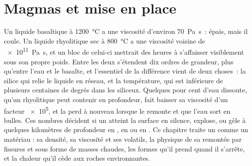 \chapter{Magmas et mise en place}\label{ch:b2:magma-emplacement}

Un liquide basaltique à \qty{1200}{\celsius} a une viscosité d'environ
\qty{70}{Pa.s}~: épais, mais il coule. Un liquide rhyolitique sec à \qty{800}{\celsius}
a une viscosité voisine de \qty{e11}{Pa.s}, et un bloc de celui-ci mettrait des heures à
s'affaisser visiblement sous son propre poids. Entre les deux s'étendent dix ordres de grandeur, plus
qu'entre l'eau et le basalte, et l'essentiel de la différence vient de deux
choses~: la silice qui relie le liquide en réseau, et la température,
qui est inférieure de plusieurs centaines de degrés dans les  siliceux. Quelques pour cent d'eau
dissoute, qu'un  rhyolitique peut contenir en profondeur, fait baisser sa viscosité
d'un facteur \num{e5}, et la perd à nouveau lorsque le  remonte et que l'eau
sort en bulles. Ces nombres décident si un  atteint la surface en silence, explose,
ou gèle à quelques kilomètres de profondeur en , en  ou en . Ce chapitre traite un
 comme un matériau : sa densité, sa viscosité et ses volatils, la physique de sa remontée
par fissures et sous forme de masses chaudes, les formes qu'il prend quand il s'arrête, et la chaleur
qu'il cède aux roches environnantes.

